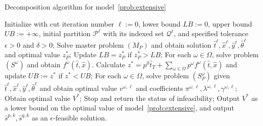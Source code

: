 \documentclass[11pt]{article}
\begin{document}
	\begin{algorithm}
		\caption{Decomposition algorithm for model~\eqref{prob:extensive}}
		\label{alg:Cut}
		\begin{algorithmic}[1]
			\State Initialize with cut iteration number \(\ell := 0\), lower bound \(LB := 0\), upper bound \(UB := +\infty\), initial partition \(\mathcal{P}^\ell\) with its indexed set \(\mathcal{Q}^\ell\), and specified tolerance \(\epsilon > 0\) and \(\delta > 0\);
			\State Solve master problem \((M_P)\) and obtain solution \(\hat{t}^{\ell}, \hat{x}^{\ell}, \hat{y}^{\ell}, \hat{\theta}^{\ell}\) and optimal value \(z_{P}^*\);
			\State Update \(LB = z_{P}^*\) if \(z_{P}^* > LB\);
			\State For each \(\omega \in \Omega\), solve problem \((S^\omega)\) and obtain \(f^{\omega}(\hat{t},\hat{x})\). 
			\State Calculate \(z^* = p^0 \hat{t}_T + \sum_{\omega \in \Omega} p^\omega f^{\omega}(\hat{t},\hat{x})\) and update \(UB := z^*\) if \(z^* < UB\);
			\State For each \(\omega \in \Omega\), solve problem \((S_P^\omega)\) given \(\hat{t}^{\ell}, \hat{x}^{\ell}, \hat{y}^{\ell}, \hat{\theta}^{\ell}\) and obtain optimal value \(v^{\omega,\ell}\) and coefficients \(\pi^{\omega,\ell}, \lambda^{\omega,\ell}, \gamma^{\omega,\ell}\);
			\State Obtain optimal value \(V^*\); 
			\Else
			\State Stop and return the status of infeasibility;
			\EndIf
			\vspace{0.1cm}
			\State Output \(V^*\) as a lower bound on the optimal value of model~\eqref{prob:extensive}, and output \(\hat{s}^{p,k}, \hat{s}^{q,k}\) as an \(\epsilon\)-feasible solution.
		\end{algorithmic}
	\end{algorithm}
\end{document}
